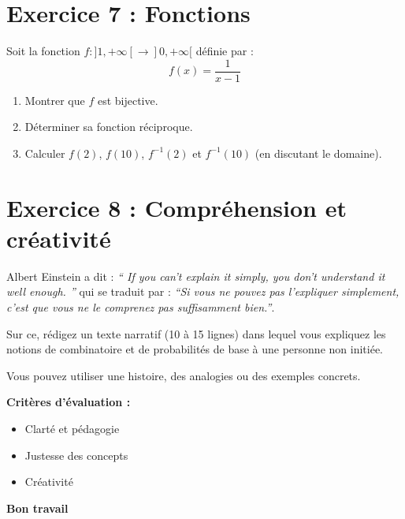 \documentclass[12pt,a4paper]{article}
\begin{document}
\section*{Exercice 7 : Fonctions}

Soit la fonction $f : ]1,+\infty[ \to ]0,+\infty[$ définie par :
\[
f(x) = \frac{1}{x-1}
\]

\begin{enumerate}
    \item Montrer que $f$ est bijective.
    \item Déterminer sa fonction réciproque.
    \item Calculer $f(2)$, $f(10)$, $f^{-1}(2)$ et $f^{-1}(10)$ (en discutant le domaine).
\end{enumerate}

\section*{Exercice 8 : Compréhension et créativité}

Albert Einstein a dit : \textit{“
If you can't explain it simply, you don't understand it well enough.
”} qui se traduit par : \textit{“Si vous ne pouvez pas l'expliquer simplement, c'est que vous ne le comprenez pas suffisamment bien.”}.

\vspace{0.3cm}

Sur ce, rédigez un texte narratif (10 à 15 lignes) dans lequel vous expliquez les notions de combinatoire et de probabilités de base à une personne non initiée.

\vspace{0.3cm}

Vous pouvez utiliser une histoire, des analogies ou des exemples concrets.

\vspace{0.3cm}

\textbf{Critères d’évaluation :}
\begin{itemize}
    \item Clarté et pédagogie
    \item Justesse des concepts
    \item Créativité
\end{itemize}

\vspace{1cm}

\begin{center}
\textbf{Bon travail}
\end{center}
\end{document}
